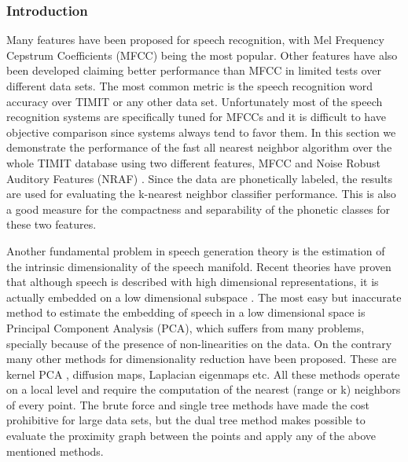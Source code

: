 \documentclass[12pt,letterpaper,doublespaced,ETD,dvips,proposal]{gtthesis}
\begin{document}
\begin{Body}
\subsubsection{Introduction}
Many features have been proposed for speech recognition, with Mel
Frequency Cepstrum Coefficients (MFCC) \cite{quatieri2002dts} being
the most popular. Other features have also been developed claiming
better performance than MFCC in limited tests over different data
sets. The most common metric is the speech recognition word accuracy
over TIMIT or any other data set. Unfortunately most of the speech
recognition systems are specifically tuned for MFCCs and it is
difficult to have objective comparison since systems always tend to
favor them. 
In this section
we demonstrate the performance of the fast all nearest neighbor
algorithm over the whole TIMIT database using two different
features, MFCC and Noise Robust Auditory Features (NRAF)
\cite{ravindran:inr}. Since the data are phonetically labeled, the
results are used for evaluating the k-nearest neighbor classifier
performance. This is also a good measure for the compactness and
separability of the phonetic classes for these two features.

Another fundamental problem in speech generation theory is the
estimation of the intrinsic dimensionality of the speech manifold. Recent
theories have proven that although speech is described with high
dimensional representations, it is actually embedded on a low
dimensional subspace \cite{jansen2006ifa}. The most easy but
inaccurate method to estimate the embedding of speech in a low
dimensional space is Principal Component Analysis (PCA), which
suffers from many problems, specially because of the presence of
non-linearities on the data. On the contrary many other methods for
dimensionality reduction have been proposed. These are kernel PCA
\cite{scholkopf:nca}, diffusion maps, Laplacian eigenmaps
\cite{coifman2006dm} etc. All these methods operate on a local level
and require the computation of the nearest (range or k) neighbors of
every point. The brute force and single tree methods have made the
cost prohibitive for large data sets, but the dual tree method makes
possible to evaluate the proximity graph between the points and
apply any of the above mentioned methods.


\end{Body}
\end{document}
